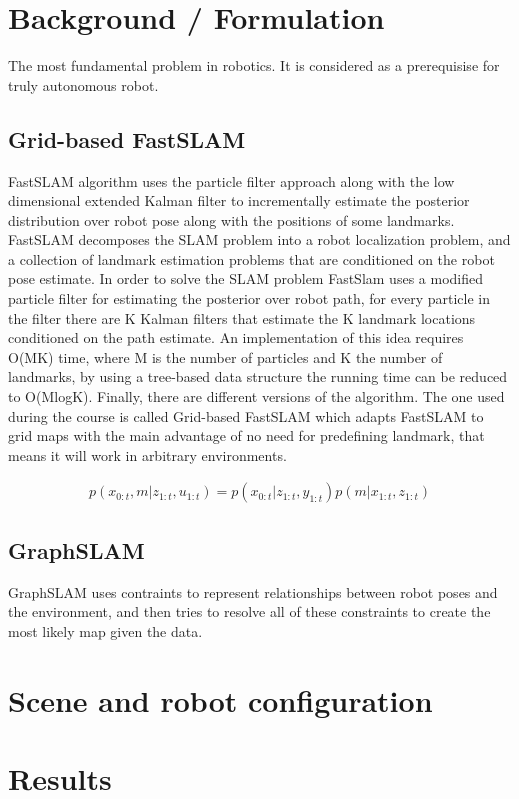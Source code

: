 \documentclass[10pt,journal,compsoc]{IEEEtran}
\begin{document}
\section{Background / Formulation}
The most fundamental problem in robotics. It is considered as a prerequisise for truly autonomous robot.
\subsection{Grid-based FastSLAM}
FastSLAM algorithm uses the particle filter approach along with the low dimensional extended Kalman filter to incrementally estimate the posterior distribution over robot pose along with the positions of some landmarks. FastSLAM decomposes the SLAM problem into a robot localization problem, and a collection of landmark estimation problems that are conditioned on the robot pose estimate. In order to solve the SLAM problem FastSlam uses a modified particle filter for estimating the posterior over robot path, for every particle in the filter there are K Kalman filters that estimate the K landmark locations conditioned on the path estimate. An implementation of this idea requires {O(MK)} time, where M is the number of particles and K the number of landmarks, by using a tree-based data structure the running time can be reduced to {O(MlogK)}. Finally, there are different versions of the algorithm. The one used during the course is called Grid-based FastSLAM which adapts FastSLAM to grid maps with the main advantage of no need for predefining landmark, that means it will work in arbitrary environments.

\begin{align}
p(x_{0:t},m|z_{1:t},u_{1:t})=p(x_{0:t}|z_{1:t},y_{1:t})p(m|x_{1:t},z_{1:t})
\end{align}

\subsection{GraphSLAM}
GraphSLAM uses contraints to represent relationships between robot poses and the environment, and then tries to resolve all of these constraints to create the most likely map given the data.

\section{Scene and robot configuration}
\section{Results}
\end{document}
